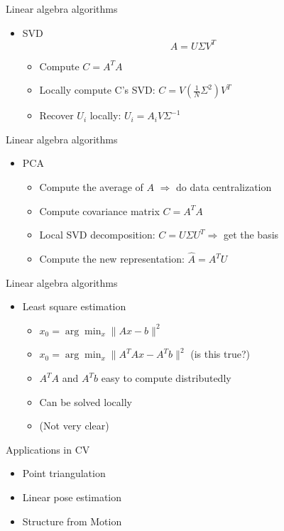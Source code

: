\documentclass[12pt]{beamer}
\begin{document}
\begin{frame}{Linear algebra algorithms}
    \begin{itemize}
        \item SVD
        \[A = U \Sigma V^T \]
        \begin{itemize}
            \item Compute $C = A^TA$
            \item Locally compute C's SVD: $C = V(\frac{1}{N}\Sigma^2)V^T$
            \item Recover $U_i$ locally: $U_i = A_iV\Sigma^{-1}$
        \end{itemize}
    \end{itemize}
\end{frame}

\begin{frame}{Linear algebra algorithms}
    \begin{itemize}
        \item PCA
        \begin{itemize}
            \item Compute the average of $A$ $\Rightarrow$ do data centralization
            \item Compute covariance matrix $C = A^TA$
            \item Local SVD decomposition: $C = U\Sigma U^T \Rightarrow$ get the basis
            \item Compute the new representation: $\hat{A} = A^TU$
        \end{itemize}
    \end{itemize}
\end{frame}

\begin{frame}{Linear algebra algorithms}
    \begin{itemize}
        \item Least square estimation
        \begin{itemize}
            \item $x_0 = \arg \min_x \lVert Ax - b\rVert^2$
            \item $x_0 = \arg \min_x \lVert A^TAx - A^Tb \rVert^2 $ (is this true?)
            \item $A^TA$ and $A^Tb$ easy to compute distributedly
            \item Can be solved locally
            \item (Not very clear)
        \end{itemize}
    \end{itemize}
\end{frame}

\begin{frame}{Applications in CV}
    \begin{itemize}
        \item Point triangulation
        \item Linear pose estimation
        \item Structure from Motion
    \end{itemize}
\end{frame}
\end{document}
